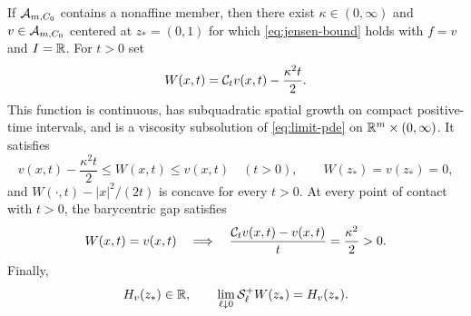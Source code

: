 \begin{proposition}\label{prop:envelope-contact}
If $\mathcal{A}_{m,C_0}$ contains a nonaffine member, then there
exist $\kappa\in(0,\infty)$ and $v\in\mathcal{A}_{m,C_0}$ centered
at $z_*=(0,1)$ for which \eqref{eq:jensen-bound} holds with $f=v$ and
$I=\mathbb{R}$.
For $t>0$ set
\begin{equation}\label{eq:contact-envelope}
  W(x,t)=\mathcal{C}_t v(x,t)-\frac{\kappa^2t}{2}.
\end{equation}
This function is continuous, has subquadratic spatial growth
on compact positive-time intervals, and is a viscosity
subsolution of \eqref{eq:limit-pde} on $\mathbb{R}^m\times(0,\infty)$.
It satisfies
\begin{equation}\label{eq:contact-sandwich}
  v(x,t)-\frac{\kappa^2t}{2}\le W(x,t)\le v(x,t)
       \quad(t>0),\qquad W(z_*)=v(z_*)=0,
\end{equation}
and $W(\cdot,t)-|x|^2/(2t)$ is concave for every $t>0$.
At every point of contact with $t>0$, the barycentric gap satisfies
\begin{equation}\label{eq:contact-barycentric-gap}
  W(x,t)=v(x,t)\quad\Longrightarrow\quad
  \frac{\mathcal{C}_t v(x,t)-v(x,t)}{t}=\frac{\kappa^2}{2}>0.
\end{equation}
Finally,
\begin{equation}\label{eq:contact-slope}
  H_v(z_*)\in\mathbb{R},\qquad
  \lim_{\ell\downarrow0}\mathcal{S}_\ell^+W(z_*)=H_v(z_*).
\end{equation}
\end{proposition}

